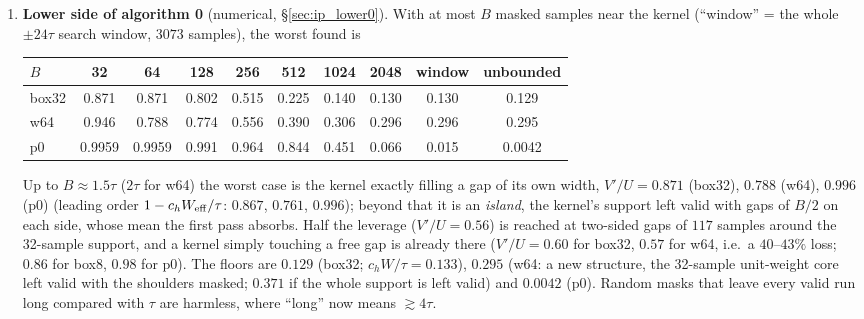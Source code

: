 \documentclass{article}
\numberwithin{equation}{section}   %
\begin{document}
\begin{enumerate}
\item {\bf Lower side of algorithm 0} (numerical, \S\ref{sec:ip_lower0}).  With at most $B$ masked samples
near the kernel (``window'' = the whole $\pm 24\tau$ search window, $3073$ samples), the worst found is
\begin{center}\small
\begin{tabular}{lccccccccc}
\toprule
$B$ & 32 & 64 & 128 & 256 & 512 & 1024 & 2048 & window & unbounded \\
\midrule
box32 & 0.871 & 0.871 & 0.802 & 0.515 & 0.225 & 0.140 & 0.130 & 0.130 & 0.129 \\
w64   & 0.946 & 0.788 & 0.774 & 0.556 & 0.390 & 0.306 & 0.296 & 0.296 & 0.295 \\
p0    & 0.9959 & 0.9959 & 0.991 & 0.964 & 0.844 & 0.451 & 0.066 & 0.015 & 0.0042 \\
\bottomrule
\end{tabular}
\end{center}
Up to $B \approx 1.5\tau$ ($2\tau$ for w64) the worst case is the kernel exactly filling a gap of its own
width, $V'/U = 0.871$ (box32), $0.788$ (w64), $0.996$ (p0) (leading order $1 - c_h W_{\rm eff}/\tau$:
$0.867$, $0.761$, $0.996$); beyond that it is an {\em island}, the kernel's support left valid with gaps
of $B/2$ on each side, whose mean the first pass absorbs.  Half the leverage ($V'/U = 0.56$) is reached at
two-sided gaps of $117$ samples around the 32-sample support, and a kernel simply touching a free gap is
already there ($V'/U = 0.60$ for box32, $0.57$ for w64, i.e.\ a $40$--$43\%$ loss; $0.86$ for box8,
$0.98$ for p0).  The floors are $0.129$ (box32; $c_h W/\tau = 0.133$), $0.295$ (w64: a new structure, the
32-sample unit-weight core left valid with the shoulders masked; $0.371$ if the whole support is left
valid) and $0.0042$ (p0).  Random masks that leave every valid run long compared with $\tau$ are
harmless, where ``long'' now means $\gtrsim 4\tau$.


\end{enumerate}
\end{document}
